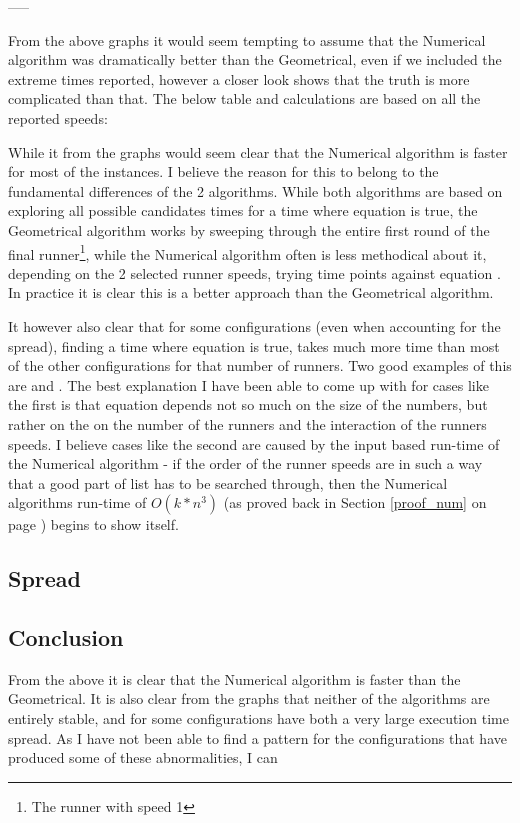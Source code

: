 -----


From the above graphs it would seem tempting to assume that the Numerical algorithm was dramatically better than the Geometrical, even if we included the extreme times reported, however a closer look shows that the truth is more complicated than that. The below table and calculations are based on all the reported speeds:

%

While it from the graphs would seem clear that the Numerical algorithm is faster for most of the instances. 
I believe the reason for this to belong to the fundamental differences of the 2 algorithms. While both algorithms are based on exploring all possible candidates times for a time where equation  is true, the Geometrical algorithm works by sweeping through the entire first round of the final runner\footnote{The runner with speed 1}, while the Numerical algorithm often is less methodical about it, depending on the 2 selected runner speeds, trying time points against equation . In practice it is clear this is a better approach than the Geometrical algorithm.
 
It however also clear that for some configurations (even when accounting for the spread), finding a time where equation  is true, takes much more time than most of the other configurations for that number of runners. Two good examples of this are  and . The best explanation I have been able to come up with for cases like the first is that equation  depends not so much on the size of the numbers, but rather on the on the number of the runners and the interaction of the runners speeds. I believe cases like the second are caused by the input based run-time of the Numerical algorithm - if the order of the runner speeds are in such a way that a good part of list has to be searched through, then the Numerical algorithms run-time of $O(k * n^3)$ (as proved back in Section \ref{proof_num} on page \pageref{proof_num}) begins to show itself.  

\subsection{Spread}
%



\subsection{Conclusion}

From the above it is clear that the Numerical algorithm is faster than the Geometrical. It is also clear from the graphs that neither of the algorithms are entirely stable, and for some configurations have both a very large execution time spread. As I have not been able to find a pattern for the configurations that have produced some of these abnormalities, I can 
